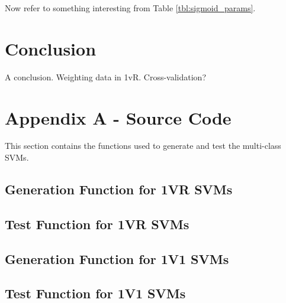 \documentclass[a4paper, 10pt, conference]{ieeeconf}
\begin{document}
Now refer to something interesting from Table \ref{tbl:sigmoid_params}.

\section{Conclusion}
A conclusion. Weighting data in 1vR. Cross-validation?




\clearpage
\onecolumn


\section*{Appendix A - Source Code}

This section contains the functions used to generate and test the multi-class SVMs.
\subsection*{Generation Function for 1VR SVMs}

\newpage
\subsection*{Test Function for 1VR SVMs}

\newpage
\subsection*{Generation Function for 1V1 SVMs}

\newpage
\subsection*{Test Function for 1V1 SVMs}


\end{document}
